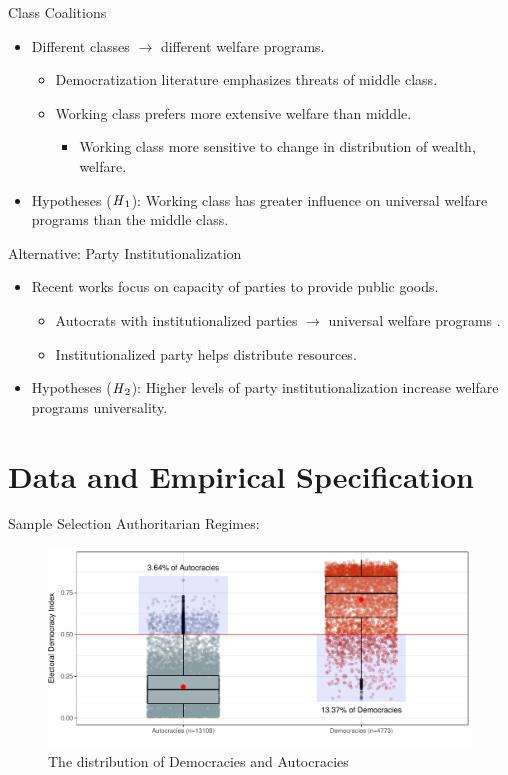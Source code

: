 \documentclass{Bredelebeamer}
\begin{document}
\begin{frame}{Class Coalitions}
\begin{itemize}
	\item Different classes $\rightarrow$ different welfare programs.
	\begin{itemize}
		\item Democratization literature emphasizes threats of middle class.
		\item Working class prefers more extensive welfare than middle.
		\begin{itemize}
			\item Working class more sensitive to change in distribution of wealth, welfare.%
		\end{itemize}
	\end{itemize}\pause
	\item Hypotheses ($\text{\textit{H}}_1$): Working class has greater influence on universal welfare programs than the middle class.
\end{itemize}
\end{frame}

\begin{frame}{Alternative: Party Institutionalization}
\begin{itemize}
	\item Recent works focus on capacity of parties to provide public goods.
	\begin{itemize}
		\item Autocrats with institutionalized parties $\rightarrow$ universal welfare programs \citep{Rasmussen2019}.
		\item Institutionalized party helps distribute resources.
	\end{itemize}\pause
	\item Hypotheses ($\text{\textit{H}}_2$): Higher levels of party institutionalization increase welfare programs universality.
\end{itemize}
\end{frame}

\section{Data and Empirical Specification}
\begin{frame}{Sample Selection}
Authoritarian Regimes: \centering \pause
\begin{figure}[!htbt]
	\centering
	\includegraphics[width=0.85\linewidth]{"../3. Datasets_Codebooks/Figures/Plot1"}
	\caption{The distribution of Democracies and Autocracies}
	\label{fig:plot1}
\end{figure}
\end{frame}	
\end{document}
